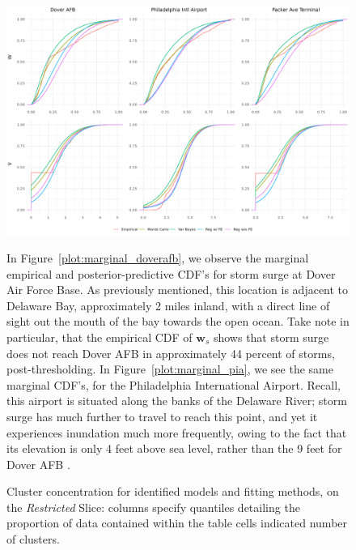 \begin{figure}[ht]
    \centering
    \includegraphics[width=0.95\linewidth]{./plots/delaware_marginal_cdfs.png}
    


In Figure~\ref{plot:marginal_doverafb}, we observe the marginal empirical and posterior-predictive
    CDF's for storm surge at Dover Air Force Base.  As previously mentioned, this location is adjacent
    to Delaware Bay, approximately 2 miles inland, with a direct line of sight out the mouth of the
    bay towards the open ocean.  Take note in particular, that the empirical CDF of $\bm{w}_s$ shows
    that storm surge does not reach Dover AFB in approximately \num{44} percent of storms, 
    post-thresholding.
In Figure~\ref{plot:marginal_pia}, we see the same marginal CDF's, for the Philadelphia International
    Airport.  Recall, this airport is situated along the banks of the Delaware River; storm surge
    has much further to travel to reach this point, and yet it experiences inundation much more 
    frequently, owing to the fact that its elevation is only 4 feet above sea level, 
    rather than the 9 feet for Dover AFB \makenote{[confirm]}.

\begin{table}[ht]
\centering
\caption{Cluster concentration for identified models and fitting 
        methods, on the \emph{Restricted} Slice: columns specify quantiles 
        detailing the proportion of data contained within the table cells 
        indicated number of clusters.\label{tab:cluster_concentration}} 

\end{table}


\end{figure}
